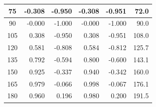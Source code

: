 \begin{table}[htbp]
\begin{center}
\begin{tabular}{|p{15 mm}|p{15 mm}|p{15 mm}|p{15 mm}|p{15 mm}|p{15 mm}|}
      \multicolumn{1}{|c|}{75}                   & \multicolumn{1}{|r|}{-0.308}                                  & \multicolumn{1}{|r|}{-0.950}                                  & \multicolumn{1}{|r|}{-0.308}               & \multicolumn{1}{|r|}{-0.951}               & \multicolumn{1}{|r|}{72.0}                     \\ \hline
      \multicolumn{1}{|c|}{90}                   & \multicolumn{1}{|r|}{-0.000}                                  & \multicolumn{1}{|r|}{-1.000}                                  & \multicolumn{1}{|r|}{-0.000}               & \multicolumn{1}{|r|}{-1.000}               & \multicolumn{1}{|r|}{90.0}                     \\ \hline
      \multicolumn{1}{|c|}{105}                  & \multicolumn{1}{|r|}{0.308}                                   & \multicolumn{1}{|r|}{-0.950}                                  & \multicolumn{1}{|r|}{0.308}                & \multicolumn{1}{|r|}{-0.951}               & \multicolumn{1}{|r|}{108.0}                    \\ \hline
      \multicolumn{1}{|c|}{120}                  & \multicolumn{1}{|r|}{0.581}                                   & \multicolumn{1}{|r|}{-0.808}                                  & \multicolumn{1}{|r|}{0.584}                & \multicolumn{1}{|r|}{-0.812}               & \multicolumn{1}{|r|}{125.7}                    \\ \hline
      \multicolumn{1}{|c|}{135}                  & \multicolumn{1}{|r|}{0.792}                                   & \multicolumn{1}{|r|}{-0.594}                                  & \multicolumn{1}{|r|}{0.800}                & \multicolumn{1}{|r|}{-0.600}               & \multicolumn{1}{|r|}{143.1}                    \\ \hline
      \multicolumn{1}{|c|}{150}                  & \multicolumn{1}{|r|}{0.925}                                   & \multicolumn{1}{|r|}{-0.337}                                  & \multicolumn{1}{|r|}{0.940}                & \multicolumn{1}{|r|}{-0.342}               & \multicolumn{1}{|r|}{160.0}                    \\ \hline
      \multicolumn{1}{|c|}{165}                  & \multicolumn{1}{|r|}{0.979}                                   & \multicolumn{1}{|r|}{-0.066}                                  & \multicolumn{1}{|r|}{0.998}                & \multicolumn{1}{|r|}{-0.067}               & \multicolumn{1}{|r|}{176.1}                    \\ \hline
      \multicolumn{1}{|c|}{180}                  & \multicolumn{1}{|r|}{0.960}                                   & \multicolumn{1}{|r|}{0.196}                                   & \multicolumn{1}{|r|}{0.980}                & \multicolumn{1}{|r|}{0.200}                & \multicolumn{1}{|r|}{191.5}                    \\ \hline

\end{tabular}
\end{center}
\end{table}
